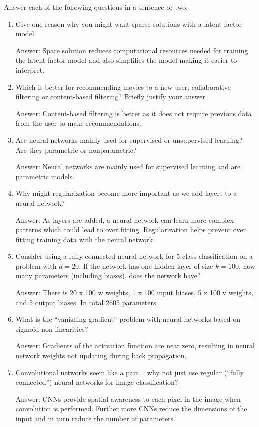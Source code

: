 \documentclass{article}
\newcommand{\blu}[1]{{\textcolor{blu}{#1}}}
\newcommand{\gre}[1]{\textcolor{gre}{#1}}
\newcommand\ans[1]{\par\gre{Answer: #1}}
\let\ask\blu
\begin{document}
\ask{Answer each of the following questions in a sentence or two.}
\begin{enumerate}

\item Give one reason why you might want sparse solutions with a latent-factor model.

\ans{Spare solution reduces computational resources needed for training the latent factor model and also simplifies the model making it easier to interpret.}

\item Which is better for recommending movies to a new user, collaborative filtering or content-based filtering? Briefly justify your answer.

\ans{Content-based filtering is better as it does not require previous data from the user to make recommendations.}

\item{Are neural networks mainly used for supervised or unsupervised learning? Are they parametric or nonparametric?}

\ans{Neural networks are mainly used for supervised learning and are parametric models.}

\item{Why might regularization become more important as we add layers to a neural network?}

\ans{As layers are added, a neural network can learn more complex patterns which could lead to over fitting. Regularization helps prevent over fitting training data with the neural network. }

\item{Consider using a fully-connected neural network for 5-class classification on a problem with $d=20$. If the network has one hidden layer of size $k=100$, how many parameters (including biases), does the network have?}

\ans{ There is 20 x 100 w weights, 1 x 100 input biases, 5 x 100 v weights, and 5 output biases. In total 2605 parameters. }

\item What is the ``vanishing gradient'' problem with neural networks based on sigmoid non-linearities?

\ans{ Gradients of the activation function are near zero, resulting in neural network weights not updating during back propagation. }

\item{Convolutional networks seem like a pain... why not just use regular (``fully connected'') neural networks for image classification?}

\ans{CNNs provide spatial awareness to each pixel in the image when convolution is performed. Further more CNNs reduce the dimensions of the input and in turn reduce the number of parameters.}

\end{enumerate}
\end{document}
